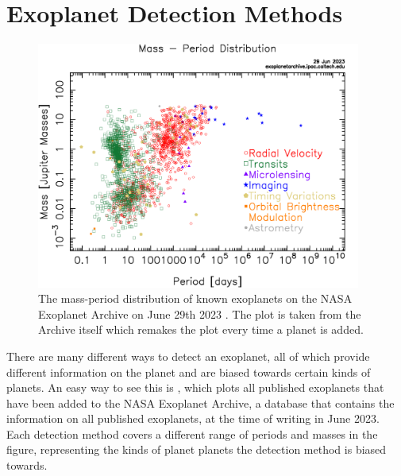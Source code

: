 
\section{Exoplanet Detection Methods}
\label{sec:detection_methods}

\begin{figure}
  \begin{center}
    \includegraphics[width=0.95\textwidth]{intro/exo_massperiod.png}
  \end{center}
  \caption{The mass-period distribution of known exoplanets on the 
  NASA Exoplanet Archive on June 29th 2023
  \citep{akesonNASAExoplanet2013}. The plot is taken from the Archive
  itself which remakes the plot every time a planet is added.}
  \label{fig:archive_exoplanet_distribution}
\end{figure}

There are many different ways to detect an exoplanet, all of which provide
different information on the planet and are biased towards certain kinds of
planets. An easy way to see this is ,
which plots all published exoplanets that have been added to the NASA Exoplanet
Archive, a database that contains the information on all published exoplanets,
at the time of writing in June 2023. Each detection method covers a different
range of periods and masses in the figure, representing the kinds of planet
planets the detection method is biased towards.

